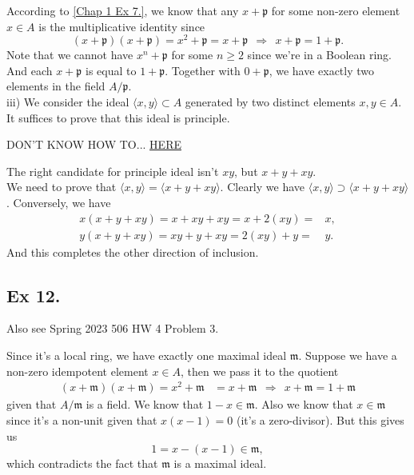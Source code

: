 According to \ref{Chap 1 Ex 7.}, we know that any $x+\mathfrak p$ for some non-zero element $x\in A$ is the multiplicative identity since
$$(x+\mathfrak p)(x+\mathfrak p)=x^2+\mathfrak p=x+\mathfrak p ~~\Rightarrow~~ x+\mathfrak p =1+\mathfrak p.$$
Note that we cannot have $x^n+\mathfrak p$ for some $n\geq 2$ since we're in a Boolean ring. And each $x+\mathfrak p$ is equal to $1+\mathfrak p$.
Together with $0+\mathfrak p$, we have exactly two elements in the field $A/\mathfrak p$.\\

\noindent iii) We consider the ideal $\langle x,y\rangle \subset A$ generated by two distinct elements $x,y\in A$. It suffices to prove that this ideal is principle.

DON'T KNOW HOW TO... \href{https://math.stackexchange.com/questions/110329/finitely-generated-ideals-in-a-boolean-ring-are-principal-why}{HERE}

The right candidate for principle ideal isn't $xy$, but $x+y+xy$.\\

We need to prove that $\langle x,y\rangle =\langle x+y+xy\rangle$. Clearly we have $\langle x,y\rangle \supset \langle x+y+xy\rangle$. Conversely, we have 
\begin{align*}
    x(x+y+xy)=x+xy+xy=x+2(xy)=&x,\\ y(x+y+xy)=xy+y+xy=2(xy)+y=&y.
\end{align*}
And this completes the other direction of inclusion.



\subsection{Ex 12.}

\vspace{0.2in}Also see Spring 2023 506 HW 4 Problem 3.\vspace{0.2in}

Since it's a local ring, we have exactly one maximal ideal $\mathfrak m$. Suppose we have a non-zero idempotent element $x\in A$, then we pass it to the quotient
\begin{align*}
    (x+\mathfrak m)(x+\mathfrak m)=x^2+\mathfrak m&=x+\mathfrak m
    ~~\Rightarrow~~ x+\mathfrak m=1+\mathfrak m
\end{align*} given that $A/\mathfrak m$ is a field. We know that $1-x\in \mathfrak m$. Also we know that $x\in\mathfrak m$ since it's a non-unit given that $x(x-1)=0$ (it's a zero-divisor). But this gives us 
$$1=x-(x-1)\in \mathfrak m,$$ which contradicts the fact that $\mathfrak m$ is a maximal ideal.\\


